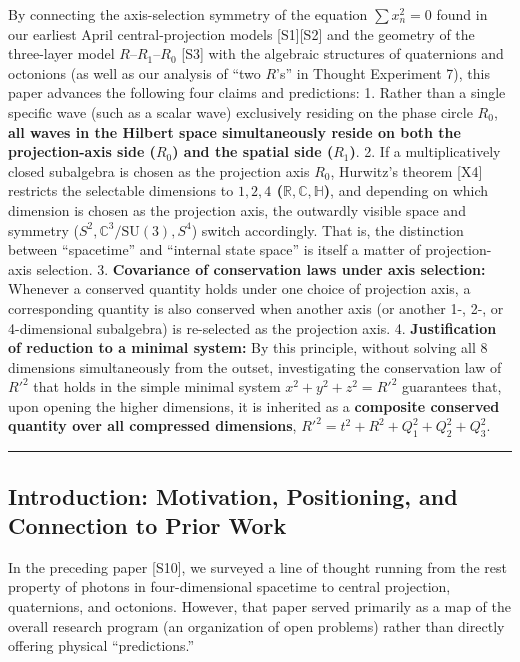 \documentclass[
  a4paper,
]{article}
\begin{document}
By connecting the axis-selection symmetry of the equation
\(\sum x_n^2 = 0\) found in our earliest April central-projection models
{[}S1{]}{[}S2{]} and the geometry of the three-layer model
\(R\)--\(R_1\)--\(R_0\) {[}S3{]} with the algebraic structures of
quaternions and octonions (as well as our analysis of ``two \(R\)'s'' in
Thought Experiment 7), this paper advances the following four claims and
predictions: 1. Rather than a single specific wave (such as a scalar
wave) exclusively residing on the phase circle \(R_0\), \textbf{all
waves in the Hilbert space simultaneously reside on both the
projection-axis side (\(R_0\)) and the spatial side (\(R_1\))}. 2. If a
multiplicatively closed subalgebra is chosen as the projection axis
\(R_0\), Hurwitz's theorem {[}X4{]} restricts the selectable dimensions
to \textbf{\(1, 2, 4\) (\(\mathbb{R}, \mathbb{C}, \mathbb{H}\))}, and
depending on which dimension is chosen as the projection axis, the
outwardly visible space and symmetry
(\(S^2, \mathbb{C}^3/\mathrm{SU}(3), S^4\)) switch accordingly. That is,
the distinction between ``spacetime'' and ``internal state space'' is
itself a matter of projection-axis selection. 3. \textbf{Covariance of
conservation laws under axis selection:} Whenever a conserved quantity
holds under one choice of projection axis, a corresponding quantity is
also conserved when another axis (or another 1-, 2-, or 4-dimensional
subalgebra) is re-selected as the projection axis. 4.
\textbf{Justification of reduction to a minimal system:} By this
principle, without solving all 8 dimensions simultaneously from the
outset, investigating the conservation law of \(R'^2\) that holds in the
simple minimal system \(x^2 + y^2 + z^2 = R'^2\) guarantees that, upon
opening the higher dimensions, it is inherited as a \textbf{composite
conserved quantity over all compressed dimensions},
\(R'^2 = t^2 + R^2 + Q_1^2 + Q_2^2 + Q_3^2\).

\begin{center}\rule{0.5\linewidth}{0.5pt}\end{center}

\subsection{Introduction: Motivation, Positioning, and Connection to
Prior
Work}\label{introduction-motivation-positioning-and-connection-to-prior-work}

In the preceding paper {[}S10{]}, we surveyed a line of thought running
from the rest property of photons in four-dimensional spacetime to
central projection, quaternions, and octonions. However, that paper
served primarily as a map of the overall research program (an
organization of open problems) rather than directly offering physical
``predictions.''
\end{document}
